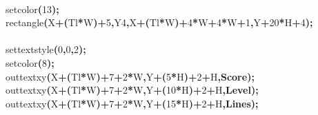 \documentclass[a4paper, 10pt]{article}
\newcommand\SPC{\hspace*{0.6em}}
\newcommand\HYP{\mbox{\char 45}}
\newcommand\QOT{\mbox{\char 34}}
\newcommand{\CppAIdentifier}[1]{#1}
\newcommand{\CppANumber}[1]{\textcolor[rgb]{0.5,0,0.5}{#1}}
\newcommand{\CppASpace}[1]{\colorbox[rgb]{1,1,1}{#1}}
\newcommand{\CppAString}[1]{\textbf{\textcolor[rgb]{0,0,1}{#1}}}
\newcommand{\CppASymbol}[1]{\textbf{\textcolor[rgb]{1,0,0}{#1}}}
\begin{document}
\begin{ttfamily}
\\
\CppASpace{\SPC \SPC \SPC \SPC \SPC \SPC \SPC }\CppAIdentifier{setcolor}\CppASymbol{(}\CppANumber{13}\CppASymbol{)}\CppASymbol{;}\\
\CppASpace{\SPC \SPC \SPC \SPC \SPC \SPC \SPC }\CppAIdentifier{rectangle}\CppASymbol{(}\CppAIdentifier{X}\CppASymbol{+}\CppASymbol{(}\CppAIdentifier{Tl}\CppASymbol{*}\CppAIdentifier{W}\CppASymbol{)}\CppASymbol{+}\CppANumber{5}\CppASymbol{,}\CppAIdentifier{Y}\CppASymbol{\HYP }\CppANumber{4}\CppASymbol{,}\CppAIdentifier{X}\CppASymbol{+}\CppASymbol{(}\CppAIdentifier{Tl}\CppASymbol{*}\CppAIdentifier{W}\CppASymbol{)}\CppASymbol{+}\CppANumber{4}\CppASymbol{*}\CppAIdentifier{W}\CppASymbol{+}\CppANumber{4}\CppASymbol{*}\CppAIdentifier{W}\CppASymbol{+}\CppANumber{1}\CppASymbol{,}\CppAIdentifier{Y}\CppASymbol{+}\CppANumber{20}\CppASymbol{*}\CppAIdentifier{H}\CppASymbol{+}\CppANumber{4}\CppASymbol{)}\CppASymbol{;}\\
\\
\CppASpace{\SPC \SPC \SPC \SPC \SPC \SPC \SPC }\CppAIdentifier{settextstyle}\CppASymbol{(}\CppANumber{0}\CppASymbol{,}\CppANumber{0}\CppASymbol{,}\CppANumber{2}\CppASymbol{)}\CppASymbol{;}\\
\CppASpace{\SPC \SPC \SPC \SPC \SPC \SPC \SPC }\CppAIdentifier{setcolor}\CppASymbol{(}\CppANumber{8}\CppASymbol{)}\CppASymbol{;}\\
\CppASpace{\SPC \SPC \SPC \SPC \SPC \SPC \SPC }\CppAIdentifier{outtextxy}\CppASymbol{(}\CppAIdentifier{X}\CppASymbol{+}\CppASymbol{(}\CppAIdentifier{Tl}\CppASymbol{*}\CppAIdentifier{W}\CppASymbol{)}\CppASymbol{+}\CppANumber{7}\CppASymbol{+}\CppANumber{2}\CppASymbol{*}\CppAIdentifier{W}\CppASymbol{,}\CppAIdentifier{Y}\CppASymbol{+}\CppASymbol{(}\CppANumber{5}\CppASymbol{*}\CppAIdentifier{H}\CppASymbol{)}\CppASymbol{+}\CppANumber{2}\CppASymbol{+}\CppAIdentifier{H}\CppASymbol{,}\CppAString{\QOT Score\QOT }\CppASymbol{)}\CppASymbol{;}\\
\CppASpace{\SPC \SPC \SPC \SPC \SPC \SPC \SPC }\CppAIdentifier{outtextxy}\CppASymbol{(}\CppAIdentifier{X}\CppASymbol{+}\CppASymbol{(}\CppAIdentifier{Tl}\CppASymbol{*}\CppAIdentifier{W}\CppASymbol{)}\CppASymbol{+}\CppANumber{7}\CppASymbol{+}\CppANumber{2}\CppASymbol{*}\CppAIdentifier{W}\CppASymbol{,}\CppAIdentifier{Y}\CppASymbol{+}\CppASymbol{(}\CppANumber{10}\CppASymbol{*}\CppAIdentifier{H}\CppASymbol{)}\CppASymbol{+}\CppANumber{2}\CppASymbol{+}\CppAIdentifier{H}\CppASymbol{,}\CppAString{\QOT Level\QOT }\CppASymbol{)}\CppASymbol{;}\\
\CppASpace{\SPC \SPC \SPC \SPC \SPC \SPC \SPC }\CppAIdentifier{outtextxy}\CppASymbol{(}\CppAIdentifier{X}\CppASymbol{+}\CppASymbol{(}\CppAIdentifier{Tl}\CppASymbol{*}\CppAIdentifier{W}\CppASymbol{)}\CppASymbol{+}\CppANumber{7}\CppASymbol{+}\CppANumber{2}\CppASymbol{*}\CppAIdentifier{W}\CppASymbol{,}\CppAIdentifier{Y}\CppASymbol{+}\CppASymbol{(}\CppANumber{15}\CppASymbol{*}\CppAIdentifier{H}\CppASymbol{)}\CppASymbol{+}\CppANumber{2}\CppASymbol{+}\CppAIdentifier{H}\CppASymbol{,}\CppAString{\QOT Lines\QOT }\CppASymbol{)}\CppASymbol{;}\\

\end{ttfamily}
\end{document}

